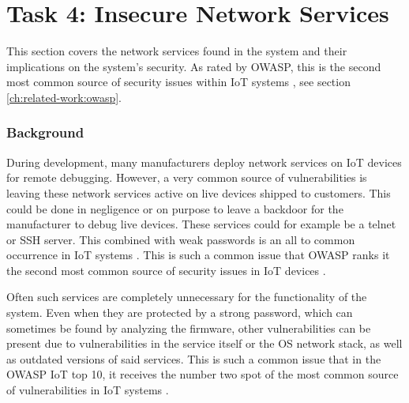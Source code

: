 \section{Task 4: Insecure Network Services} \label{ch:pentesting:network-services}
This section covers the network services found in the system and their implications on the system's security. As rated by OWASP, this is the second most common source of security issues within IoT systems \cite{owasp-iot-top10}, see section \ref{ch:related-work:owasp}.

\subsubsection{Background}
During development, many manufacturers deploy network services on IoT devices for remote debugging. However, a very common source of vulnerabilities is leaving these network services active on live devices shipped to customers. This could be done in negligence or on purpose to leave a backdoor for the manufacturer to debug live devices. These services could for example be a telnet or SSH server. This combined with weak passwords is an all to common occurrence in IoT systems \cite{understanding-mirai}. This is such a common issue that OWASP ranks it the second most common source of security issues in IoT devices \cite{owasp-iot-top10}.

Often such services are completely unnecessary for the functionality of the system. Even when they are protected by a strong password, which can sometimes be found by analyzing the firmware, other vulnerabilities can be present due to vulnerabilities in the service itself or the OS network stack, as well as outdated versions of said services. This is such a common issue that in the OWASP IoT top 10, it receives the number two spot of the most common source of vulnerabilities in IoT systems \cite{owasp-iot-top10}.


